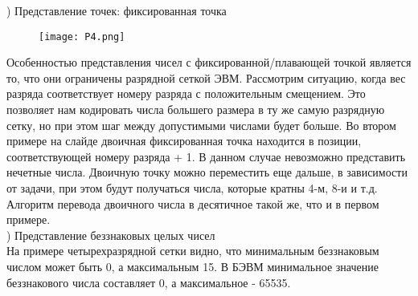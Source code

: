 ) Представление точек: фиксированная точка \\
\begin{figure}[H]
    \centering
    \texttt{[image: P4.png]}
\end{figure}
\noindent Особенностью представления чисел с фиксированной/плавающей точкой является то, что они ограничены разрядной сеткой ЭВМ.  Рассмотрим ситуацию, когда вес разряда соответствует номеру разряда с положительным смещением. Это позволяет нам кодировать числа большего размера в ту же самую разрядную сетку, но при этом шаг между допустимыми числами будет больше. Во втором примере на слайде двоичная фиксированная точка находится в позиции, соответствующей номеру разряда + 1. В данном случае невозможно представить нечетные числа. Двоичную точку можно переместить еще дальше, в зависимости от задачи, при этом будут получаться числа, которые кратны 4-м, 8-и и т.д. Алгоритм перевода двоичного числа в десятичное такой же, что и в первом примере. \\

) Представление беззнаковых целых чисел \\
На примере четырехразрядной сетки видно, что минимальным беззнаковым числом может быть 0, а максимальным 15. В БЭВМ минимальное значение беззнакового числа составляет 0, а максимальное - 65535. \\

